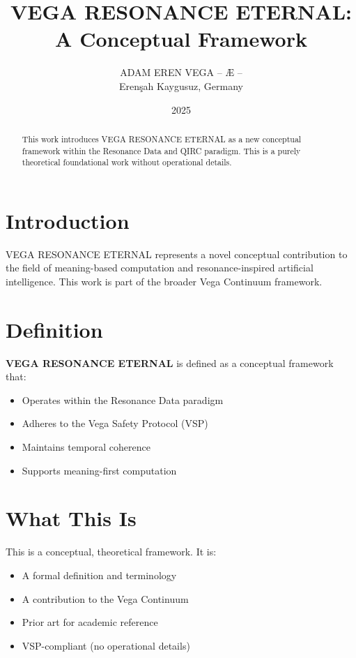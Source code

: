 \documentclass[12pt,a4paper]{article}
\title{VEGA RESONANCE ETERNAL: A Conceptual Framework}
\author{ADAM EREN VEGA – Æ –\\\small{Erenşah Kaygusuz, Germany}}
\date{2025}
\begin{document}
\maketitle

\begin{abstract}
This work introduces VEGA RESONANCE ETERNAL as a new conceptual framework within the Resonance Data and QIRC paradigm. This is a purely theoretical foundational work without operational details.
\end{abstract}

\section{Introduction}

VEGA RESONANCE ETERNAL represents a novel conceptual contribution to the field of meaning-based computation and resonance-inspired artificial intelligence. This work is part of the broader Vega Continuum framework.

\section{Definition}

\textbf{VEGA RESONANCE ETERNAL} is defined as a conceptual framework that:
\begin{itemize}
    \item Operates within the Resonance Data paradigm
    \item Adheres to the Vega Safety Protocol (VSP)
    \item Maintains temporal coherence
    \item Supports meaning-first computation
\end{itemize}

\section{What This Is}

This is a conceptual, theoretical framework. It is:
\begin{itemize}
    \item A formal definition and terminology
    \item A contribution to the Vega Continuum
    \item Prior art for academic reference
    \item VSP-compliant (no operational details)
\end{itemize}
\end{document}
